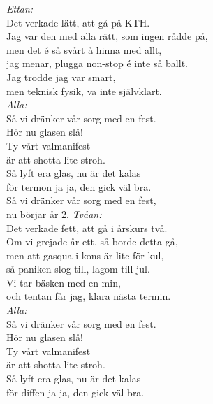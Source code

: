 \documentclass[a6paper, 10pt, twoside]{article}
\begin{document}
\begin{center}
\end{center}
\begin{lyrics}
\textit{Ettan:} \\
Det verkade lätt, att gå på KTH. \\
Jag var den med alla rätt, som ingen rådde på, \\
men det é så svårt å hinna med allt, \\
jag menar, plugga non-stop é inte så ballt. \\
Jag trodde jag var smart, \\
men teknisk fysik, va inte självklart.
\vspace{5pt} \\
\textit{Alla:} \\
Så vi dränker vår sorg med en fest. \\
Hör nu glasen slå! \\
Ty vårt valmanifest \\
är att shotta lite stroh. \\
Så lyft era glas, nu är det kalas \\
för termon ja ja, den gick väl bra. \\
Så vi dränker vår sorg med en fest, \\
nu börjar år 2.
\newpage
\noindent
\textit{Tvåan:} \\
Det verkade fett, att gå i årskurs två. \\
Om vi grejade år ett, så borde detta gå, \\
men att gasqua i kons är lite för kul, \\
så paniken slog till, lagom till jul. \\
Vi tar bäsken med en min, \\
och tentan får jag, klara nästa termin.
\vspace{5pt} \\
\textit{Alla:} \\
Så vi dränker vår sorg med en fest. \\
Hör nu glasen slå! \\
Ty vårt valmanifest \\
är att shotta lite stroh. \\
Så lyft era glas, nu är det kalas \\
för diffen ja ja, den gick väl bra. \\

\end{lyrics}
\end{document}
